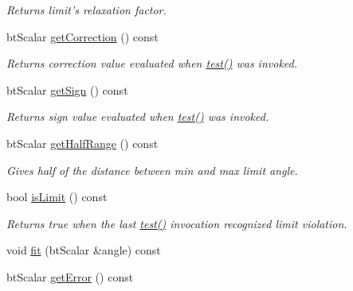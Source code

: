 \begin{DoxyCompactItemize}
\begin{DoxyCompactList}\small\item\em Returns limit's relaxation factor. \end{DoxyCompactList}\item 
\hypertarget{classbt_angular_limit_a73c14b4cefb5365b3fa6c122ffe4a474}{bt\+Scalar \hyperlink{classbt_angular_limit_a73c14b4cefb5365b3fa6c122ffe4a474}{get\+Correction} () const }\label{classbt_angular_limit_a73c14b4cefb5365b3fa6c122ffe4a474}

\begin{DoxyCompactList}\small\item\em Returns correction value evaluated when \hyperlink{classbt_angular_limit_aa8908e320fa18257118bbe81948142d8}{test()} was invoked. \end{DoxyCompactList}\item 
\hypertarget{classbt_angular_limit_a4a0f0d2a8b7eecb565e9b4b925139ae9}{bt\+Scalar \hyperlink{classbt_angular_limit_a4a0f0d2a8b7eecb565e9b4b925139ae9}{get\+Sign} () const }\label{classbt_angular_limit_a4a0f0d2a8b7eecb565e9b4b925139ae9}

\begin{DoxyCompactList}\small\item\em Returns sign value evaluated when \hyperlink{classbt_angular_limit_aa8908e320fa18257118bbe81948142d8}{test()} was invoked. \end{DoxyCompactList}\item 
\hypertarget{classbt_angular_limit_aec3e3a9373f428db1d4890ca09c8cf94}{bt\+Scalar \hyperlink{classbt_angular_limit_aec3e3a9373f428db1d4890ca09c8cf94}{get\+Half\+Range} () const }\label{classbt_angular_limit_aec3e3a9373f428db1d4890ca09c8cf94}

\begin{DoxyCompactList}\small\item\em Gives half of the distance between min and max limit angle. \end{DoxyCompactList}\item 
\hypertarget{classbt_angular_limit_ad894b9c62420a46701079ece02fafc8a}{bool \hyperlink{classbt_angular_limit_ad894b9c62420a46701079ece02fafc8a}{is\+Limit} () const }\label{classbt_angular_limit_ad894b9c62420a46701079ece02fafc8a}

\begin{DoxyCompactList}\small\item\em Returns true when the last \hyperlink{classbt_angular_limit_aa8908e320fa18257118bbe81948142d8}{test()} invocation recognized limit violation. \end{DoxyCompactList}\item 
void \hyperlink{classbt_angular_limit_a3b5ba8325c06e456f55971f99cc5bb93}{fit} (bt\+Scalar \&angle) const 
\item 
\hypertarget{classbt_angular_limit_a5b299b6324cab71edf3385ea1d94fb7c}{bt\+Scalar \hyperlink{classbt_angular_limit_a5b299b6324cab71edf3385ea1d94fb7c}{get\+Error} () const }\label{classbt_angular_limit_a5b299b6324cab71edf3385ea1d94fb7c}


\end{DoxyCompactItemize}
